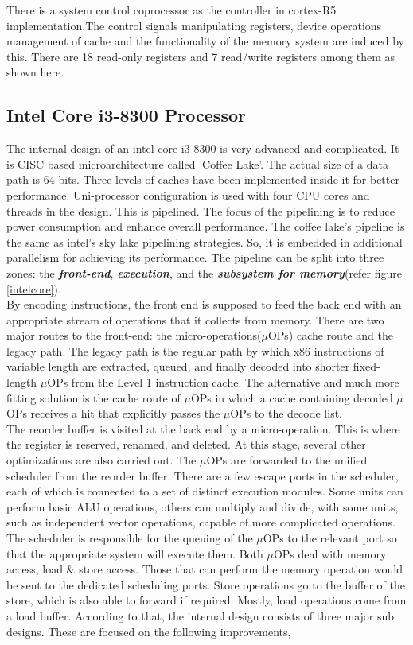 \documentclass[a4paper,11pt]{article}
\begin{document}
There is a system control coprocessor as the controller in cortex-R5 implementation.The control signals manipulating registers, device operations management of cache and the functionality of the memory system are induced by this. There are 18 read-only registers and 7 read/write registers among them as shown here.


\subsection{Intel Core i3-8300 Processor}
The internal design of an intel core i3 8300 is very advanced and complicated. It is CISC based microarchitecture called 'Coffee Lake'.  The actual size of a data path is 64 bits. Three levels of caches have been implemented inside it for better performance. Uni-processor configuration is used with four CPU cores and threads in the design. This is pipelined. The focus of the pipelining is to reduce power consumption and enhance overall performance. The coffee lake's pipeline is the same as intel's sky lake pipelining strategies. So, it is embedded in additional parallelism for achieving its performance. The pipeline can be split into three zones: the \textbf{\textit{front-end}}, \textit{\textbf{execution}}, and the \textbf{\textit{subsystem for memory}}(refer figure \ref{intelcore}).\\

By encoding instructions, the front end is supposed to feed the back end with an appropriate stream of operations that it collects from memory. There are two major routes to the front-end: the micro-operations($\mu$OPs) cache route and the legacy path. The legacy path is the regular path by which x86 instructions of variable length are extracted, queued, and finally decoded into shorter fixed-length $\mu$OPs from the Level 1 instruction cache. The alternative and much more fitting solution is the cache route of $\mu$OPs in which a cache containing decoded $\mu$OPs receives a hit that explicitly passes the $\mu$OPs to the decode list.\\

The reorder buffer is visited at the back end by a micro-operation. This is where the register is reserved, renamed, and deleted. At this stage, several other optimizations are also carried out. The $\mu$OPs are forwarded to the unified scheduler from the reorder buffer. There are a few escape ports in the scheduler, each of which is connected to a set of distinct execution modules. Some units can perform basic ALU operations, others can multiply and divide, with some units, such as independent vector operations, capable of more complicated operations. The scheduler is responsible for the queuing of the $\mu$OPs to the relevant port so that the appropriate system will execute them. Both $\mu$OPs deal with memory access, load \& store access. Those that can perform the memory operation would be sent to the dedicated scheduling ports. Store operations go to the buffer of the store, which is also able to forward if required. Mostly, load operations come from a load buffer.  According to that, the internal design consists of three major sub designs. These are focused on the following improvements,
\end{document}
